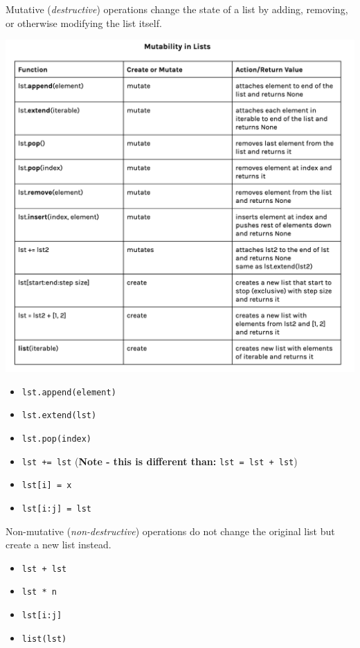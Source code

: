 \begin{blocksection}
Mutative (\emph{destructive}) operations change the state of a list by adding,
removing, or otherwise modifying the list itself.

\includegraphics[width=.9\textwidth]{list-mutation.png}

\begin{itemize}
\item \lstinline$lst.append(element)$
\item \lstinline$lst.extend(lst)$
\item \lstinline$lst.pop(index)$
\item \lstinline$lst += lst$ (\textbf{Note - this is different than:} \lstinline$lst = lst + lst$)
\item \lstinline$lst[i] = x$
\item \lstinline$lst[i:j] = lst$
\end{itemize}
\end{blocksection}

\vspace{\parskip}

\begin{blocksection}
Non-mutative (\emph{non-destructive}) operations do not change the original list but create a new list instead.

\begin{itemize}
\item \lstinline$lst + lst$
\item \lstinline$lst * n$
\item \lstinline$lst[i:j]$
\item \lstinline$list(lst)$
\end{itemize}
\end{blocksection}

\vspace{\parskip}
